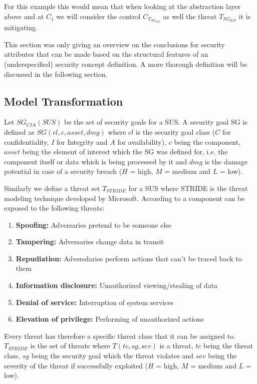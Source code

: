 For this example this would mean that when looking at the abstraction layer above and at $C_1$ we will consider the control $C_{T_{SG_{KD}}}$ as well the threat $T_{SG_{KD}}$ it is mitigating.

This section was only giving an overview on the conclusions for security attributes that can be made based on the structural features of an (underspecified) security concept definition. A more thorough definition will be discussed in the following section. 

\subsection{Model Transformation}

Let $SG_{CIA}(SUS)$ be the set of security goals for a SUS. A security goal SG is defined as $SG(cl, c, asset, dmg)$ where $cl$ is the security goal class ($C$ for confidentiality, $I$ for Integrity and $A$ for availability), $c$ being the component, $asset$ being the element of interest which the SG was defined for, i.e. the component itself or data which is being processed by it and $dmg$ is the damage potential in case of a security breach ($H$ = high, $M$ = medium and $L$ = low).

Similarly we define a threat set $T_{STRIDE}$ for a SUS where STRIDE is the threat modeling technique developed by Microsoft. According to \cite{torr} a component can be exposed to the following threats:

\begin{enumerate}
\item[]\textbf{Spoofing:} Adversaries pretend to be someone else
\item[]\textbf{Tampering:} Adversaries change data in transit
\item[]\textbf{Repudiation:} Adversdaries perform actions that can't be traced back to them
\item[]\textbf{Information disclosure:} Unauthorized viewing/stealing of data
\item[]\textbf{Denial of service:} Interruption of system services
\item[]\textbf{Elevation of privilege:} Performing of unauthorized actions
\end{enumerate}

Every threat has therefore a specific threat class that it can be assigned to. $T_{STRIDE}$ is the set of threats where $T(tc, sg, sev)$ is a threat, $tc$ being the threat class, $sg$ being the security goal which the threat violates and $sev$ being the severity of the threat if successfully exploited ($H$ = high, $M$ = medium and $L$ = low). 

